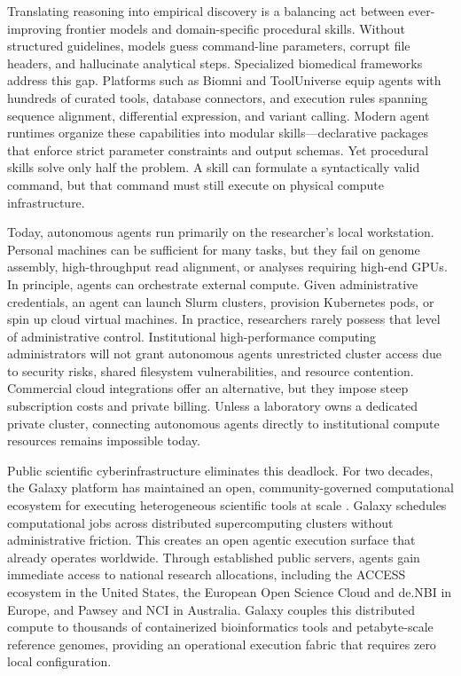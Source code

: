 \documentclass[11pt,letterpaper]{article}
\begin{document}
Translating reasoning into empirical discovery is a balancing act between ever-improving frontier models and domain-specific procedural skills. Without structured guidelines, models guess command-line parameters, corrupt file headers, and hallucinate analytical steps. Specialized biomedical frameworks address this gap. Platforms such as Biomni \cite{huang2025biomni} and ToolUniverse \cite{gao2025democratizingaiscientistsusing} equip agents with hundreds of curated tools, database connectors, and execution rules spanning sequence alignment, differential expression, and variant calling. Modern agent runtimes organize these capabilities into modular skills---declarative packages that enforce strict parameter constraints and output schemas. Yet procedural skills solve only half the problem. A skill can formulate a syntactically valid command, but that command must still execute on physical compute infrastructure.

Today, autonomous agents run primarily on the researcher's local workstation. Personal machines can be sufficient for many tasks, but they fail on genome assembly, high-throughput read alignment, or analyses requiring high-end GPUs. In principle, agents can orchestrate external compute. Given administrative credentials, an agent can launch Slurm clusters, provision Kubernetes pods, or spin up cloud virtual machines. In practice, researchers rarely possess that level of administrative control. Institutional high-performance computing administrators will not grant autonomous agents unrestricted cluster access due to security risks, shared filesystem vulnerabilities, and resource contention. Commercial cloud integrations offer an alternative, but they impose steep subscription costs and private billing. Unless a laboratory owns a dedicated private cluster, connecting autonomous agents directly to institutional compute resources remains impossible today.

Public scientific cyberinfrastructure eliminates this deadlock. For two decades, the Galaxy platform has maintained an open, community-governed computational ecosystem for executing heterogeneous scientific tools at scale \cite{galaxy2024}. Galaxy schedules computational jobs across distributed supercomputing clusters without administrative friction. This creates an open agentic execution surface that already operates worldwide. Through established public servers, agents gain immediate access to national research allocations, including the ACCESS ecosystem in the United States, the European Open Science Cloud and de.NBI in Europe, and Pawsey and NCI in Australia. Galaxy couples this distributed compute to thousands of containerized bioinformatics tools and petabyte-scale reference genomes, providing an operational execution fabric that requires zero local configuration.
\end{document}
